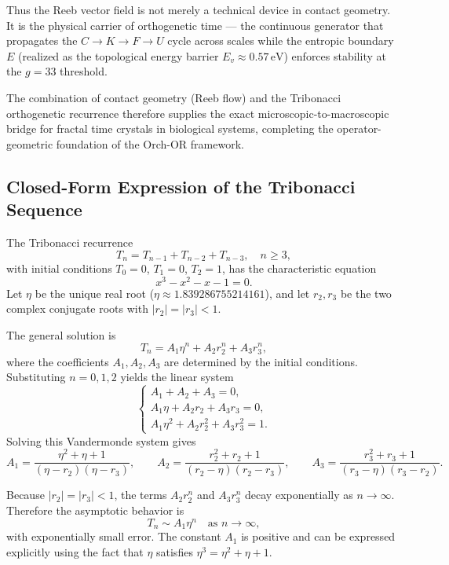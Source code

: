 \documentclass[11pt,a4paper]{article}
\theoremstyle{definition}
\theoremstyle{remark}
\begin{document}
Thus the Reeb vector field is not merely a technical device in contact geometry. It is the
physical carrier of orthogenetic time --- the continuous generator that propagates the
$C\to K\to F\to U$ cycle across scales while the entropic boundary $E$ (realized as the
topological energy barrier $E_v\approx0.57\,\text{eV}$) enforces stability at the $g=33$ threshold.

The combination of contact geometry (Reeb flow) and the Tribonacci orthogenetic recurrence
therefore supplies the exact microscopic-to-macroscopic bridge for fractal time crystals in
biological systems, completing the operator-geometric foundation of the Orch-OR framework.

\subsection{Closed-Form Expression of the Tribonacci Sequence}

The Tribonacci recurrence
\[
  T_n=T_{n-1}+T_{n-2}+T_{n-3},\quad n\ge3,
\]
with initial conditions $T_0=0$, $T_1=0$, $T_2=1$, has the characteristic equation
\[
  x^3-x^2-x-1=0.
\]
Let $\eta$ be the unique real root ($\eta\approx1.839286755214161$), and let $r_2,r_3$ be the
two complex conjugate roots with $|r_2|=|r_3|<1$.

The general solution is
\[
  T_n=A_1\eta^n+A_2r_2^n+A_3r_3^n,
\]
where the coefficients $A_1,A_2,A_3$ are determined by the initial conditions. Substituting
$n=0,1,2$ yields the linear system
\[
  \begin{cases}
    A_1+A_2+A_3=0,\\
    A_1\eta+A_2r_2+A_3r_3=0,\\
    A_1\eta^2+A_2r_2^2+A_3r_3^2=1.
  \end{cases}
\]
Solving this Vandermonde system gives
\[
  A_1=\frac{\eta^2+\eta+1}{(\eta-r_2)(\eta-r_3)},\qquad
  A_2=\frac{r_2^2+r_2+1}{(r_2-\eta)(r_2-r_3)},\qquad
  A_3=\frac{r_3^2+r_3+1}{(r_3-\eta)(r_3-r_2)}.
\]

Because $|r_2|=|r_3|<1$, the terms $A_2r_2^n$ and $A_3r_3^n$ decay exponentially as
$n\to\infty$. Therefore the asymptotic behavior is
\[
  T_n\sim A_1\eta^n\quad\text{as }n\to\infty,
\]
with exponentially small error. The constant $A_1$ is positive and can be expressed explicitly
using the fact that $\eta$ satisfies $\eta^3=\eta^2+\eta+1$.

\end{document}
